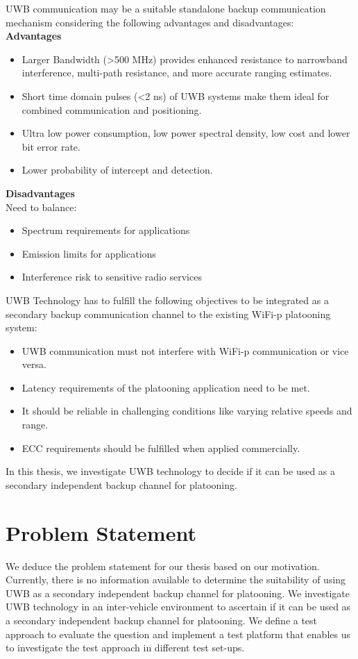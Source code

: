 UWB communication may be a suitable standalone backup communication mechanism considering the following advantages and disadvantages:\\
\textbf{Advantages}
\begin{itemize}
	\item Larger Bandwidth (\textgreater 500 MHz) provides enhanced resistance to narrowband interference, multi-path resistance, and more accurate ranging estimates.
	\item Short time domain pulses (\textless 2 ns) of UWB systems make them ideal for combined communication and positioning.
	\item Ultra low power consumption, low power spectral density, low cost and lower bit error rate.
	\item Lower probability of intercept and detection.\\
\end{itemize} 
\textbf{Disadvantages}\\
Need to balance:
\begin{itemize}
	\item Spectrum requirements for applications
	\item Emission limits for applications
	\item Interference risk to sensitive radio services
\end{itemize}

UWB Technology has to fulfill the following objectives to be integrated as a secondary backup communication channel to the existing WiFi-p platooning system: 
\begin{itemize}
	\item UWB communication must not interfere with WiFi-p communication or vice versa.
	\item Latency requirements of the platooning application need to be met.
	\item It should be reliable in challenging conditions like varying relative speeds and range.
	\item ECC requirements should be fulfilled when applied commercially.
\end{itemize}

In this thesis, we investigate UWB technology to decide if it can be used as a secondary independent backup channel for platooning.

\section{Problem Statement}
We deduce the problem statement for our thesis based on our motivation. Currently, there is no information available to determine the suitability of using UWB as a secondary independent backup channel for platooning. We investigate UWB technology in an inter-vehicle environment to ascertain if it can be used as a secondary independent backup channel for platooning. We define a test approach to evaluate the question and implement a test platform that enables us to investigate the test approach in different test set-ups.

